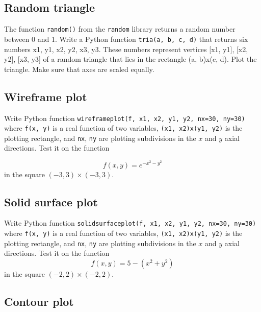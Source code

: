 
\subsection{Random triangle}

The function {\tt random()} from the {\tt random} library returns a random number between 0 and 1.  
Write a Python function {\tt tria(a, b, c, d)} that returns six numbers x1, y1, x2, y2, x3, y3. These numbers 
represent vertices [x1, y1], [x2, y2], [x3, y3] of a random triangle that lies in the rectangle (a, b)x(c, d). 
Plot the triangle. Make sure that axes are scaled equally.


\subsection{Wireframe plot}

Write Python function {\tt wireframeplot(f, x1, x2, y1, y2, nx=30, ny=30)} where {\tt f(x, y)} is a real function 
of two variables, {\tt (x1, x2)x(y1, y2)} is the plotting rectangle, and {\tt nx}, {\tt ny} are plotting 
subdivisions in the $x$ and $y$ axial directions. Test it on the function 

$$
f(x, y) = e^{-x^2 - y^2}
$$
in the square $(-3, 3)\times (-3, 3)$.


\subsection{Solid surface plot}

Write Python function {\tt solidsurfaceplot(f, x1, x2, y1, y2, nx=30, ny=30)} where {\tt f(x, y)} is a real function 
of two variables, {\tt (x1, x2)x(y1, y2)} is the plotting rectangle, and {\tt nx}, {\tt ny} are plotting 
subdivisions in the $x$ and $y$ axial directions. Test it on the function 
$$
f(x, y) = 5 - (x^2 + y^2)
$$
in the square $(-2, 2)\times (-2, 2)$.


\subsection{Contour plot}

